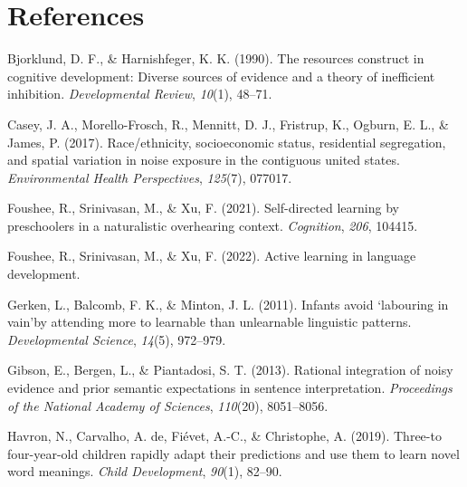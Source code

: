 \documentclass[10pt, letterpaper]{article}
\newenvironment{CSLReferences}%
  {}%
  {\par}
\begin{document}
\hypertarget{references}{%
\section{References}\label{references}}

\setlength{\parindent}{-0.1in} 
\setlength{\leftskip}{0.125in}

\noindent

\hypertarget{refs}{}
\begin{CSLReferences}{1}{0}
\leavevmode{}%
Bjorklund, D. F., \& Harnishfeger, K. K. (1990). The resources construct
in cognitive development: Diverse sources of evidence and a theory of
inefficient inhibition. \emph{Developmental Review}, \emph{10}(1),
48--71.

\leavevmode{}%
Casey, J. A., Morello-Frosch, R., Mennitt, D. J., Fristrup, K., Ogburn,
E. L., \& James, P. (2017). Race/ethnicity, socioeconomic status,
residential segregation, and spatial variation in noise exposure in the
contiguous united states. \emph{Environmental Health Perspectives},
\emph{125}(7), 077017.

\leavevmode{}%
Foushee, R., Srinivasan, M., \& Xu, F. (2021). Self-directed learning by
preschoolers in a naturalistic overhearing context. \emph{Cognition},
\emph{206}, 104415.

\leavevmode{}%
Foushee, R., Srinivasan, M., \& Xu, F. (2022). Active learning in
language development.

\leavevmode{}%
Gerken, L., Balcomb, F. K., \& Minton, J. L. (2011). Infants avoid
`labouring in vain'by attending more to learnable than unlearnable
linguistic patterns. \emph{Developmental Science}, \emph{14}(5),
972--979.

\leavevmode{}%
Gibson, E., Bergen, L., \& Piantadosi, S. T. (2013). Rational
integration of noisy evidence and prior semantic expectations in
sentence interpretation. \emph{Proceedings of the National Academy of
Sciences}, \emph{110}(20), 8051--8056.

\leavevmode{}%
Havron, N., Carvalho, A. de, Fiévet, A.-C., \& Christophe, A. (2019).
Three-to four-year-old children rapidly adapt their predictions and use
them to learn novel word meanings. \emph{Child Development},
\emph{90}(1), 82--90.


\end{CSLReferences}
\end{document}
